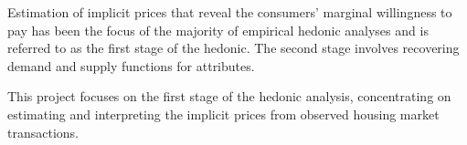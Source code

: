 Estimation of implicit prices that reveal the consumers' marginal willingness to pay has been the focus of the majority of empirical hedonic analyses and is referred to as the first stage of the hedonic. The second stage involves recovering demand and supply functions for attributes.

This project focuses on the first stage of the hedonic analysis, concentrating on estimating and interpreting the implicit prices from observed housing market transactions.
